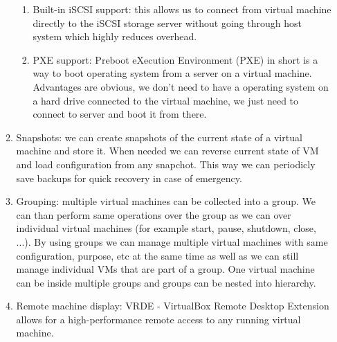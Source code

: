 \begin{itemize}
\begin{enumerate}
\begin{enumerate}
\item Built-in iSCSI support: this allows us to connect from virtual machine directly to the iSCSI storage server without going through host system which
highly reduces overhead.
\item PXE support: Preboot eXecution Environment (PXE) in short is a way to boot operating system from a server on a virtual machine. Advantages are obvious, we don't need to have a operating system on a hard drive connected to the virtual machine, we just need to connect to server and boot it from there.
\end{enumerate}
\item Snapshots: we can create snapshots of the current state of a virtual machine and store it. When needed we can reverse current state of VM and load configuration from any snapchot. This way we can periodicly save backups for quick recovery in case of emergency.
\item Grouping: multiple virtual machines can be collected into a group. We can than perform same operations over the group as we can over individual virtual machines (for example start, pause, shutdown, close, ...). By using groups we can manage multiple virtual machines with same configuration, purpose, etc at the same time as well as we can still manage individual VMs that are part of a group. One virtual machine can be inside multiple groups and groups can be nested into hierarchy.
\item Remote machine display: VRDE - VirtualBox Remote Desktop Extension allows for a high-performance remote access to any running virtual machine.
\end{enumerate}



\end{itemize}
